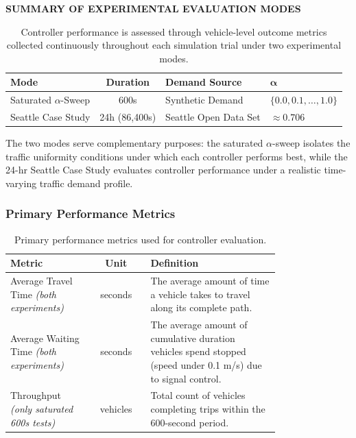 \documentclass[12pt]{article}
\begin{document}
\begin{table}[H]
\centering
\textbf{\textsc{SUMMARY OF EXPERIMENTAL EVALUATION MODES}}

\vspace{0.3cm}

\begin{tabular}{@{} l c l l @{}}
\toprule
\textbf{Mode} & \textbf{Duration} & \textbf{Demand Source} & $\boldsymbol{\alpha}$ \\
\midrule
Saturated $\alpha$-Sweep & 600s & Synthetic Demand & $\{0.0, 0.1, \ldots, 1.0\}$ \\
Seattle Case Study & 24h (86,400s) & Seattle Open Data Set & $\approx 0.706$ \\
\bottomrule
\end{tabular}
\caption{Controller performance is assessed through vehicle-level outcome metrics collected continuously throughout each simulation trial under two experimental modes.}
\label{tab:eval-modes}
\end{table}


The two modes serve complementary purposes: the saturated $\alpha$-sweep isolates the traffic uniformity conditions under which each controller performs best, while the 24-hr Seattle Case Study evaluates controller performance under a realistic time-varying traffic demand profile.

\subsubsection{Primary Performance Metrics}
\begin{table}[H]
\centering
\begin{tabular}{@{} p{0.30\linewidth} c p{0.48\linewidth} @{}}
\toprule
\textbf{Metric} & \textbf{Unit} & \textbf{Definition} \\
\midrule
Average Travel Time \emph{(both experiments)} & seconds &
The average amount of time a vehicle takes to travel along its complete path. \\
Average Waiting Time \emph{(both experiments)} & seconds &
The average amount of cumulative duration vehicles spend stopped (speed under 0.1 m/s) due to signal control. \\
Throughput \emph{(only saturated 600s tests)} & vehicles &
Total count of vehicles completing trips within the 600-second period. \\
\bottomrule
\end{tabular}
\caption{Primary performance metrics used for controller evaluation.}
\label{tab:performance-metrics}
\end{table}
\end{document}
